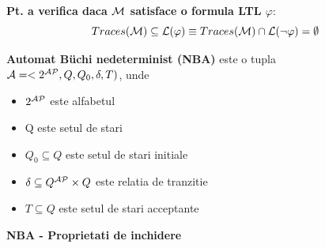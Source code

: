 \documentclass[10pt,a4paper,twocolumn]{report}
\begin{document}
\textbf{Pt. a verifica daca $\mathcal{M}$ satisface o formula LTL $\varphi$}:
\[Traces(\mathcal{M}) \subseteq \mathcal{L}(\varphi) \equiv Traces(\mathcal{M}) \cap \mathcal{L}(\neg \varphi) = \emptyset\]

\textbf{Automat B\"{u}chi nedeterminist (NBA)} este o tupla\\
$\mathcal{A} = <2^{\mathcal{AP}}, Q, Q_0, \delta, T)$, unde
\begin{itemize}
	\item $2^{\mathcal{AP}}$ este alfabetul
	\item Q este setul de stari
	\item $Q_0 \subseteq Q$ este setul de stari initiale
	\item $\delta \subseteq Q \time 2^\AP \times Q$ este relatia de tranzitie
	\item $T \subseteq Q$ este setul de stari acceptante
\end{itemize}
\textbf{NBA - Proprietati de inchidere}
\end{document}
